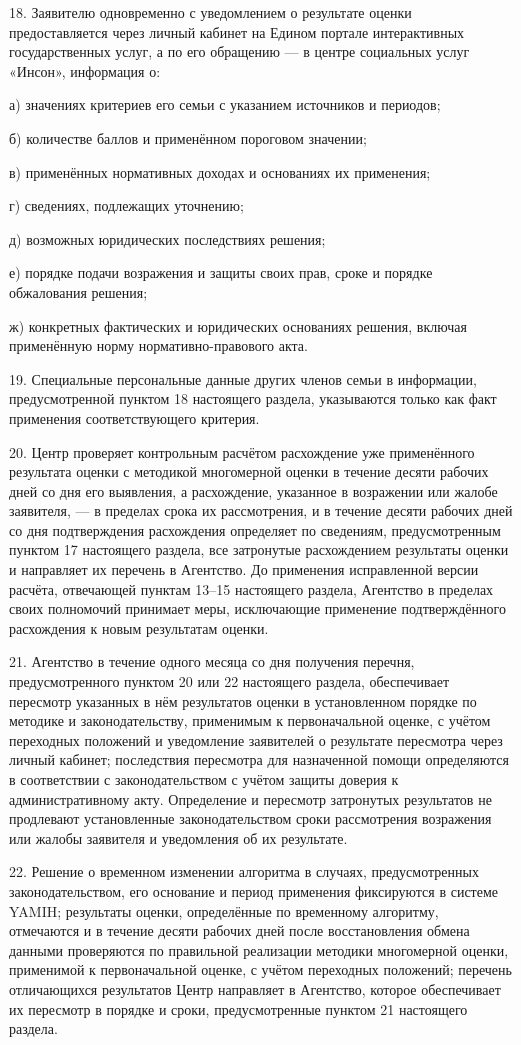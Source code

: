 \documentclass[14pt,a4paper]{extarticle}
\newcommand{\norm}[1]{\par\noindent\hspace*{1.27cm}#1. }
\newcommand{\sub}[1]{\par\noindent\hspace*{1.27cm}#1 }
\begin{document}
\norm{18}Заявителю одновременно с уведомлением о результате оценки предоставляется через личный кабинет на Едином портале интерактивных государственных услуг, а по его обращению — в центре социальных услуг «Инсон», информация о:
\sub{а)}значениях критериев его семьи с указанием источников и периодов;
\sub{б)}количестве баллов и применённом пороговом значении;
\sub{в)}применённых нормативных доходах и основаниях их применения;
\sub{г)}сведениях, подлежащих уточнению;
\sub{д)}возможных юридических последствиях решения;
\sub{е)}порядке подачи возражения и защиты своих прав, сроке и порядке обжалования решения;
\sub{ж)}конкретных фактических и юридических основаниях решения, включая применённую норму нормативно-правового акта.

\norm{19}Специальные персональные данные других членов семьи в информации, предусмотренной пунктом 18 настоящего раздела, указываются только как факт применения соответствующего критерия.

\norm{20}Центр проверяет контрольным расчётом расхождение уже применённого результата оценки с методикой многомерной оценки в течение десяти рабочих дней со дня его выявления, а расхождение, указанное в возражении или жалобе заявителя, — в пределах срока их рассмотрения, и в течение десяти рабочих дней со дня подтверждения расхождения определяет по сведениям, предусмотренным пунктом 17 настоящего раздела, все затронутые расхождением результаты оценки и направляет их перечень в Агентство. До применения исправленной версии расчёта, отвечающей пунктам 13–15 настоящего раздела, Агентство в пределах своих полномочий принимает меры, исключающие применение подтверждённого расхождения к новым результатам оценки.

\norm{21}Агентство в течение одного месяца со дня получения перечня, предусмотренного пунктом 20 или 22 настоящего раздела, обеспечивает пересмотр указанных в нём результатов оценки в установленном порядке по методике и законодательству, применимым к первоначальной оценке, с учётом переходных положений и уведомление заявителей о результате пересмотра через личный кабинет; последствия пересмотра для назначенной помощи определяются в соответствии с законодательством с учётом защиты доверия к административному акту. Определение и пересмотр затронутых результатов не продлевают установленные законодательством сроки рассмотрения возражения или жалобы заявителя и уведомления об их результате.

\norm{22}Решение о временном изменении алгоритма в случаях, предусмотренных законодательством, его основание и период применения фиксируются в системе YAMIH; результаты оценки, определённые по временному алгоритму, отмечаются и в течение десяти рабочих дней после восстановления обмена данными проверяются по правильной реализации методики многомерной оценки, применимой к первоначальной оценке, с учётом переходных положений; перечень отличающихся результатов Центр направляет в Агентство, которое обеспечивает их пересмотр в порядке и сроки, предусмотренные пунктом 21 настоящего раздела.
\end{document}
